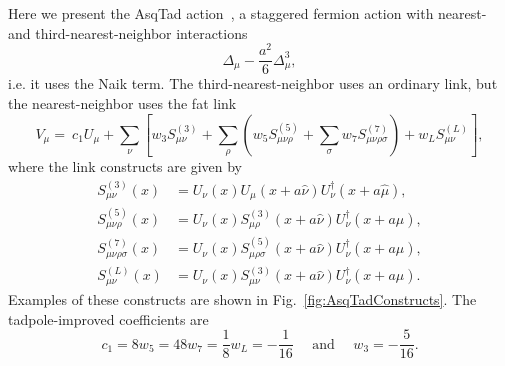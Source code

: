 Here we present the AsqTad
action~\cite{orginos_variants_1999,lepage_flavor-symmetry_1999}, a staggered
fermion action with nearest- and third-nearest-neighbor interactions
\begin{equation}
  \Delta_\mu-\frac{a^2}{6}\Delta_\mu^3,
\end{equation}
i.e. it uses the Naik term.
The third-nearest-neighbor uses an ordinary link, but the nearest-neighbor
uses the fat link
\begin{equation}
  V_\mu=~c_1U_\mu
           +\sum_\nu\left[w_3S_{\mu\nu}^{(3)}
           +\sum_\rho\left(w_5S_{\mu\nu\rho}^{(5)}
           +\sum_\sigma w_7S^{(7)}_{\mu\nu\rho\sigma}\right)
            +w_LS^{(L)}_{\mu\nu}\right],
\end{equation}
where the link constructs are given by
\begin{equation}\begin{aligned}
  S_{\mu\nu}^{(3)}(x)
       &=U_\nu(x)U_\mu(x+a\hat{\nu})U_\nu^\dagger(x+a\hat{\mu}),\\
  S_{\mu\nu\rho}^{(5)}(x)
       &=U_\nu(x)S_{\mu\rho}^{(3)}(x+a\hat{\nu})U_\nu^\dagger(x+a\hat{\mu}),\\
  S_{\mu\nu\rho\sigma}^{(7)}(x)
       &=U_\nu(x)S_{\mu\rho\sigma}^{(5)}(x+a\hat{\nu})
         U_\nu^\dagger(x+a\hat{\mu}),\\
  S_{\mu\nu}^{(L)}(x)
       &=U_\nu(x)S_{\mu\nu}^{(3)}(x+a\hat{\nu})U_\nu^\dagger(x+a\hat{\mu}).
\end{aligned}\end{equation}
Examples of these constructs are shown in Fig.~\ref{fig:AsqTadConstructs}.
The tadpole-improved coefficients are
\begin{equation}
  c_1=8w_5=48w_7=\frac{1}{8}w_L=-\frac{1}{16}~~~~~~\text{and}~~~~~~
     w_3=-\frac{5}{16}.
\end{equation}



